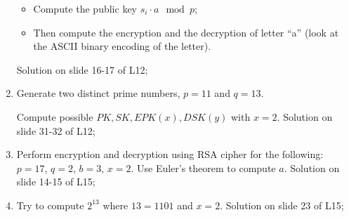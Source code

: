 \begin{enumerate}
    \begin{itemize}
        \item Compute the public key $s_i \cdot a \mod p$;
        \item Then compute the encryption and the decryption of letter “a” (look at the ASCII binary encoding of the letter).
    \end{itemize}

    Solution on slide 16-17 of L12;

    \item Generate two distinct prime numbers, $p=11$ and $q=13$. 
    
    Compute possible $PK, SK, EPK(x), DSK(y)$ with $x=2$. Solution on slide 31-32 of L12;

    \item Perform encryption and decryption using RSA cipher for the following: $p = 17$, $q = 2$, $b = 3$, $x = 2$. Use Euler's theorem to compute $a$. Solution on slide 14-15 of L15;

    \item Try to compute $2^{13}$ where $13 = 1101$ and $x = 2$. Solution on slide 23 of L15;

\end{enumerate}
